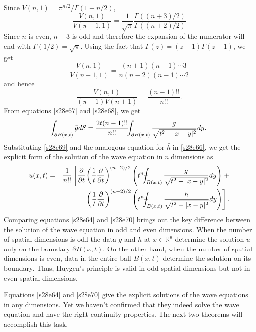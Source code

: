 \documentclass{article}
\newcommand{\fint}{\mbox{--}\mkern-16mu\int}
\theoremstyle{plain}
\numberwithin{thm}{section}
\theoremstyle{plain}
\numberwithin{prop}{section}
\theoremstyle{definition}
\numberwithin{defn}{section}
\theoremstyle{remark}
\numberwithin{equation}{section}
\begin{document}
Since $V(n, 1) = \pi^{n/2}/\Gamma(1 + n/2)$, 
\[
\frac{V(n,1)}{V(n+1,1)} = \frac{1}{\sqrt{\pi}}\frac{\Gamma((n+3)/2)}{\Gamma((n+2)/2)}
\]
Since $n$ is even, $n+3$ is odd and therefore the expansion of the numerator will end with $\Gamma(1/2) = 
\sqrt{\pi}$. Using the fact that $\Gamma(z) = (z-1)\Gamma(z-1)$, we get
\[
\frac{V(n,1)}{V(n+1,1)} = \frac{(n+1)(n-1) \cdots 3}{n(n-2)(n-4) \cdots 2}
\]
and hence
\begin{equation}\label{s28e68}
\frac{V(n,1)}{(n+1)V(n+1)} = \frac{(n-1)!!}{n!!}.
\end{equation}
From equations \eqref{s28e67} and \eqref{s28e68}, we get
\begin{equation}\label{s28e69}
\fint_{\partial\bar{B}(x,t)}\bar{g}d\bar{S} = \frac{2t(n-1)!!}{n!!}
\fint_{\partial B(x,t)}\frac{g}{\sqrt{t^2 - |x - y|^2}}dy.
\end{equation}
Substituting \eqref{s28e69} and the analogous equation for $\bar{h}$ in \eqref{s28e66}, we get the explicit form
of the solution of the wave equation in $n$ dimensions as
\begin{eqnarray}
u(x,t) &=& \frac{1}{n!!}\left[\frac{\partial}{\partial t}\left(\frac{1}{t}\frac{\partial}{\partial t}
\right)^{(n-2)/2}\left(t^n\fint_{B(x,t)}\frac{g}{\sqrt{t^2 - |x - y|^2}}dy\right)\right. + \nonumber \\
& & \left.\left(\frac{1}{t}\frac{\partial}{\partial t}\right)^{(n-2)/2}\left(t^n
\fint_{B(x,t)}\frac{h}{\sqrt{t^2 - |x - y|^2}}dy\right)\right]. \label{s28e70}
\end{eqnarray}
Comparing equations \eqref{s28e64} and \eqref{s28e70} brings out the key difference between the solution of the
wave equation in odd and even dimensions. When the number of spatial dimensions is odd the data $g$ and $h$ at
$x \in \mathbb{R}^n$ determine the solution $u$ only on the boundary $\partial B(x, t)$. On the other hand, when
the number of spatial dimensions is even, data in the entire ball $B(x, t)$ determine the solution on its boundary.
Thus, Huygen's principle is valid in odd spatial dimensions but not in even spatial dimensions.

Equations \eqref{s28e64} and \eqref{s28e70} give the explicit solutions of the wave equations in any dimensions. 
Yet we haven't confirmed that they indeed solve the wave equation and have the right continuity properties. The
next two theorems will accomplish this task.
\end{document}
